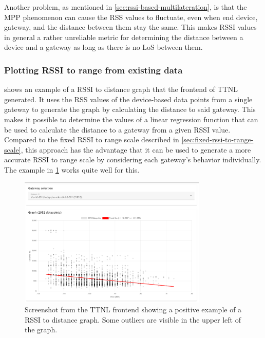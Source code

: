Another problem, as mentioned in \cref{sec:rssi-based-multilateration}, is that the \ac{MPP} phenomenon can cause the \ac{RSS} values to fluctuate, even when end device, gateway, and the distance between them stay the same.
This makes RSSI values in general a rather unreliable metric for determining the distance between a device and a gateway as long as there is no \ac{LoS} between them.

\subsubsection{Plotting \acs{RSSI} to range from existing data}\label{sec:plotting-rssi-to-range-from-existing-data}

 shows an example of a \ac{RSSI} to distance graph that the frontend of \ac{TTNL} generated.
It uses the \ac{RSS} values of the device-based data points from a single gateway to generate the graph by calculating the distance to said gateway.
This makes it possible to determine the values of a linear regression function that can be used to calculate the distance to a gateway from a given \ac{RSSI} value.
Compared to the fixed \ac{RSSI} to range scale described in \cref{sec:fixed-rssi-to-range-scale}, this approach has the advantage that it can be used to generate a more accurate \ac{RSSI} to range scale by considering each gateway's behavior individually.
The example in \cref{fig:rssi-range-graph-positive-example} works quite well for this.

\begin{figure}[htbp]
    \centering
    \includegraphics[width=0.8\textwidth]{pictures/ttn-locator/frontend/data/gateway_ghb_rssi_range_graph.png}
    \caption{
        Screenshot from the \ac{TTNL} frontend showing a positive example of a \ac{RSSI} to distance graph.
        Some outliers are visible in the upper left of the graph.
    }\label{fig:rssi-range-graph-positive-example}
\end{figure}

